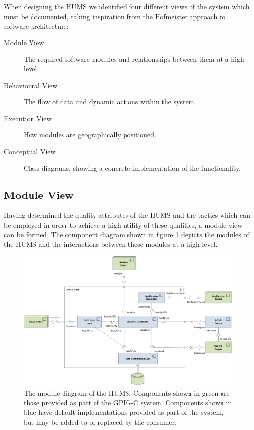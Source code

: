 \documentclass[10pt,a4paper]{article}
\begin{document}
When designing the HUMS we identified four different views of the
system which must be documented, taking inspiration from the
Hofmeister\cite{hof1999} approach to software architecture:

\begin{description}
  \item[Module View] The required software modules and relationships
    between them at a high level.

  \item[Behavioural View] The flow of data and dynamic actions within
    the system.

  \item[Execution View] How modules are geographically positioned.

  \item[Conceptual View] Class diagrams, showing a concrete
    implementation of the functionality.
\end{description}

\subsection{Module View}
\label{sec:architecture-moduleview}

Having determined the quality attributes of the HUMS and the tactics
which can be employed in order to achieve a high utility of these
qualities, a module view can be formed. The component diagram
shown in figure \ref{fig:ComponentDiagram} depicts the modules of the
HUMS and the interactions between these modules at a high level.


\begin{figure}[!ht]
  \centering
  \includegraphics[width=14cm]{images/ComponentDiagram.png}
  \caption{The module diagram of the HUMS. Components shown in green are those provided as part of the GPIG-C system. Components shown in blue have default implementations provided as part of the system, but may be added to or replaced by the consumer.}
  \label{fig:ComponentDiagram}
\end{figure}
\end{document}
